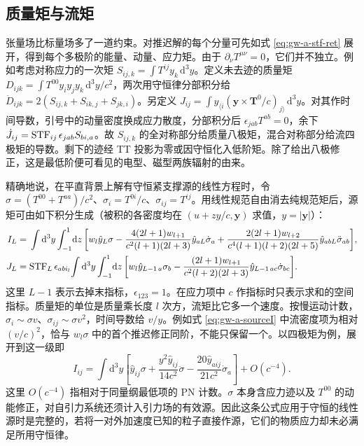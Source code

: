\subsection{质量矩与流矩}

张量场比标量场多了一道约束。对推迟解的每个分量可先如式 \eqref{eq:gw-a-stf-ret} 展开，得到每个多极阶的能量、动量、应力矩。由于 $\partial_\nu T^{\mu\nu}=0$，它们并不独立。例如考虑对称应力的一次矩 $S_{ij,k}=\int T^{ij}y_k\,\mathrm d^3y$。定义未去迹的质量矩 $D_{ijk}=\int T^{00}y_iy_jy_k\,\mathrm d^3y/c^2$，两次用守恒律分部积分给 $\ddot D_{ijk} =2(S_{ij,k}+S_{ik,j}+S_{jk,i})$。另定义 $J_{ij}=\int y_{\langle i}(\bm y\times \bm T^{0}/c)_{j\rangle}\,\mathrm d^3y$。对其作时间导数，引号中的动量密度换成应力散度，分部积分后 $\epsilon_{jab}T^{ab}=0$，余下 $\dot J_{ij}={\rm STF}_{ij}\,\epsilon_{jab}S_{bi,a}$。故 $S_{ij,k}$ 的全对称部分给质量八极矩，混合对称部分给流四极矩的导数。剩下的迹经 TT 投影为零或因守恒化入低阶矩。除了给出八极修正，这是最低阶便可看见的电型、磁型两族辐射的由来。

精确地说，在平直背景上解有守恒紧支撑源的线性方程时，令 $\sigma=(T^{00}+T^{aa})/c^2$、$\sigma_i=T^{0i}/c$、$\sigma_{ij}=T^{ij}$。用线性规范自由消去纯规范矩后，源矩可由如下积分生成（被积的各密度均在 $(u+z y/c,\bm y)$ 求值，$y=|\bm y|$）：
\begin{align}
 I_L={}&\int\mathrm d^3y\int_{-1}^{1}\!\mathrm dz\,
 \bigg[w_l\hat y_L\sigma
 -\frac{4(2l+1)w_{l+1}}{c^2(l+1)(2l+3)}\hat y_{aL}\dot\sigma_a
 +\frac{2(2l+1)w_{l+2}}{c^4(l+1)(l+2)(2l+5)}
       \hat y_{abL}\ddot\sigma_{ab}\bigg],\label{eq:gw-a-sourceI}\\
 J_L={}&{\rm STF}_{L}\,\epsilon_{ab i_l}\!
 \int\mathrm d^3y\int_{-1}^{1}\!\mathrm dz\,
 \bigg[w_l\hat y_{L-1\,a}\sigma_b
 -\frac{(2l+1)w_{l+1}}{c^2(l+2)(2l+3)}
      \hat y_{L-1\,ac}\dot\sigma_{bc}\bigg].
 \label{eq:gw-a-sourceJ}
\end{align}
这里 $L-1$ 表示去掉末指标，$\epsilon_{123}=1$。在应力项中 $c$ 作指标时只表示求和的空间指标。质量矩的单位是质量乘长度 $l$ 次方，流矩比它多一个速度。按慢运动计数，$\sigma_i\sim\sigma v$、$\sigma_{ij}\sim\sigma v^2$，时间导数给 $v/y$。例如式 \eqref{eq:gw-a-sourceI} 中流密度项为相对 $(v/c)^2$，恰与 $w_l\sigma$ 中的首个推迟修正同阶，不能只保留一个。以四极矩为例，展开到这一级即
\[
 I_{ij}=\int\mathrm d^3y\left[
 \hat y_{ij}\sigma+\frac{y^2\hat y_{ij}}{14c^2}\ddot\sigma
              -\frac{20\hat y_{aij}}{21c^2}\dot\sigma_a\right]
 +O(c^{-4}) .
\]
这里 $O(c^{-4})$ 指相对于同量纲最低项的 PN 计数。$\sigma$ 本身含应力迹以及 $T^{00}$ 的动能修正，对自引力系统还须计入引力场的有效源。因此这条公式应用于守恒的线性源时是完整的，若将一对外加速度已知的粒子直接作源，它们的物质应力却未必满足所用守恒律。

